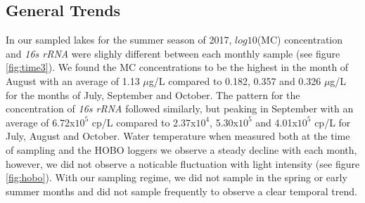 \subsection{General Trends}
In our sampled lakes for the summer season of 2017, $log10$(MC) concentration and \emph{16s rRNA} were slighly different between each monthly sample (see figure \ref{fig:time3}). We found the MC concentrations to be the highest in the month of August with an average of 1.13 $\mu$g/L compared to 0.182, 0.357 and 0.326 $\mu$g/L for the months of July, September and October. The pattern for the concentration of \emph{16s rRNA} followed similarly, but peaking in September with an average of 6.72x$10^5$ cp/L compared to 2.37x$10^4$, 5.30x$10^5$ and 4.01x$10^5$ cp/L for July, August and October. Water temperature when measured both at the time of sampling and the HOBO loggers we observe a steady decline with each month, however, we did not observe a noticable fluctuation with light intensity (see figure \ref{fig:hobo}). With our sampling regime, we did not sample in the spring or early summer months and did not sample frequently to observe a clear temporal trend. 


